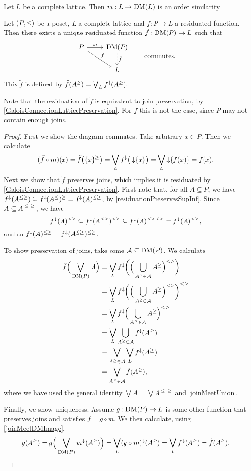 \begin{lemma}
Let $L$ be a complete lattice. Then $m: L\to \operatorname{DM}(L)$ is an order similarity.
\end{lemma}

\begin{proposition}
Let $\sSet{P, \leq}$ be a poset, $L$ a complete lattice and $f: P\to L$ a residuated function. Then there exists a unique residuated function $\tilde{f}: \operatorname{DM}(P) \to L$ such that
\[ \begin{tikzcd}
P \ar[r, "m"] \ar[dr, "f"] & \DM(P) \ar[d, dashed, "{\tilde{f}}"] \\
{} & L
\end{tikzcd} \qquad \text{commutes.} \]
This $\tilde{f}$ is defined by $\tilde{f}(A^\geq) = \bigvee_L f^\downarrow(A^\geq)$.
\end{proposition}
Note that the residuation of $\tilde{f}$ is equivalent to join preservation, by \ref{GaloisConnectionLatticePreservation}. For $f$ this is not the case, since $P$ may not contain enough joins.
\begin{proof}
First we show the diagram commutes. Take arbitrary $x\in P$. Then we calculate
\[ (\tilde{f}\circ m)(x) = \tilde{f}\big(\{x\}^\geq\big) = \bigvee_L f^\downarrow\big(\operatorname{\downarrow}\{x\}\big) = \bigvee_L \operatorname{\downarrow}\{f(x)\} = f(x). \]
Next we show that $\tilde{f}$ preserves joins, which implies it is residuated by \ref{GaloisConnectionLatticePreservation}. First note that, for all $A\subseteq P$, we have $f^\downarrow(A^{\leq \geq}) \subseteq f^\downarrow(A^\leq)^\geq = f^\downarrow(A)^{\leq\geq}$, by \ref{residuationPreservesSupInf}. Since $A\subseteq A^{\leq\geq}$, we have
\[ f^\downarrow(A)^{\leq\geq} \subseteq f^\downarrow(A^{\leq \geq})^{\leq\geq} \subseteq f^\downarrow(A)^{\leq\geq\leq\geq} = f^\downarrow(A)^{\leq\geq}, \]
and so $f^\downarrow(A)^{\leq\geq} = f^\downarrow(A^{\leq \geq})^{\leq\geq}$.

To show preservation of joins, take some $\mathcal{A}\subseteq \operatorname{DM}(P)$. We calculate
\begin{align*}
\tilde{f}\Big(\bigvee_{\operatorname{DM}(P)}\mathcal{A}\Big) &= \bigvee_Lf^\downarrow\bigg(\Big(\bigcup_{A^\geq \in \mathcal{A}}A^\geq\Big)^{\leq\geq}\bigg) \\
&= \bigvee_Lf^\downarrow\bigg(\Big(\bigcup_{A^\geq \in \mathcal{A}}A^\geq\Big)^{\leq\geq}\bigg)^{\leq\geq} \\
&= \bigvee_Lf^\downarrow\Big(\bigcup_{A^\geq \in \mathcal{A}}A^\geq\Big)^{\leq\geq} \\
&= \bigvee_L\bigcup_{A^\geq \in \mathcal{A}} f^\downarrow(A^\geq) \\
&= \bigvee_{A^\geq \in \mathcal{A}}\bigvee_L f^\downarrow(A^\geq) \\
&= \bigvee_{A^\geq \in \mathcal{A}}\tilde{f}(A^\geq),
\end{align*}
where we have used the general identity $\bigvee A = \bigvee A^{\leq\geq}$ and \ref{joinMeetUnion}.

Finally, we show uniqueness. Assume $g: \operatorname{DM}(P)\to L$ is some other function that preserves joins and satisfies $f = g\circ m$. We then calculate, using \ref{joinMeetDMImage},
\[ g(A^\geq) = g\Big(\bigvee_{\operatorname{DM}(P)}m^\downarrow(A^\geq)\Big) = \bigvee_L (g\circ m)^\downarrow(A^\geq) = \bigvee_L f^\downarrow(A^\geq) = \tilde{f}(A^\geq). \]
\end{proof}

